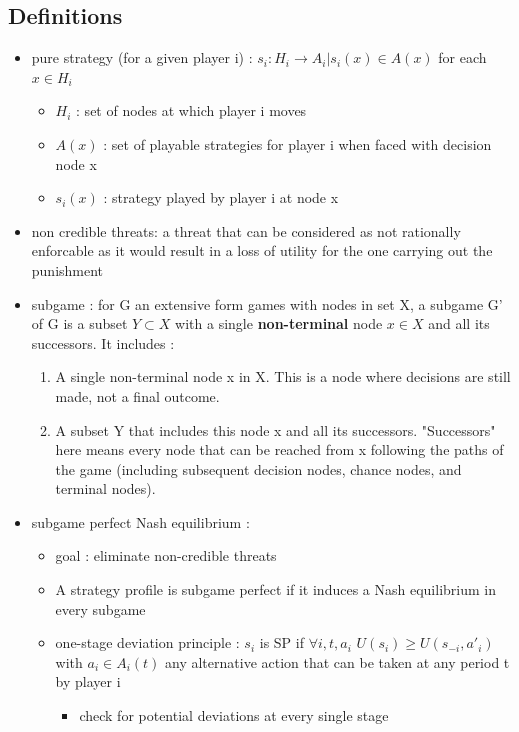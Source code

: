 \documentclass{article}
\begin{document}
\subsection{Definitions}
\begin{itemize}
    \item pure strategy (for a given player i) : $s_i : H_i \rightarrow A_i | s_i(x)\in A(x)$ for each $x\in H_i$ 
    \begin{itemize}
        \item $H_i$ : set of nodes at which player i moves
        \item $A(x)$ : set of playable strategies for player i when faced with decision node x 
        \item $s_i(x)$ : strategy played by player i at node x
    \end{itemize}
    \item non credible threats:  a threat that can be considered as not rationally enforcable as it would result in a loss of utility for the one carrying out the punishment
    \item subgame : for G an extensive form games with nodes in set X, a subgame G' of G is a subset $Y\subset X$ with a single \textbf{non-terminal} node $x\in X$ and all its successors. It includes : 
    \begin{enumerate}
        \item A single non-terminal node x in X. This is a node where decisions are still made, not a final outcome.
        \item A subset Y that includes this node x and all its successors. "Successors" here means every node that can be reached from x following the paths of the game (including subsequent decision nodes, chance nodes, and terminal nodes).
    \end{enumerate}
    \item subgame perfect Nash equilibrium : 
    \begin{itemize}
        \item goal : eliminate non-credible threats
        \item A strategy profile is subgame perfect if it induces a Nash equilibrium in every subgame 
    \item one-stage deviation principle : $s_i$ is SP if $\forall i,t,a_i$ $U(s_i) \geq U(s_{-i},a'_i) $ with $a_i \in A_i(t)$ any alternative action that can be taken at any period t by player i
    \begin{itemize}
        \item check for potential deviations at every single stage
    \end{itemize}
    \end{itemize}
\end{itemize}
\end{document}
